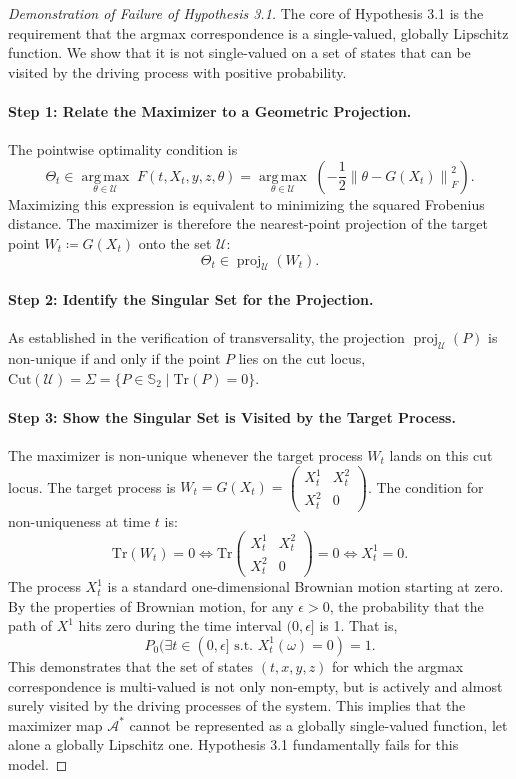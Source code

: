 \documentclass[12pt, letterpaper]{amsart}
\newcommand{\Thetacal}{\mathcal{A}}
\newcommand{\Ucal}{\mathcal{U}}
\newcommand{\norm}[1]{\left\lVert#1\right\rVert}
\newcommand{\Tr}{\mathrm{Tr}}
\DeclareMathOperator*{\argmax}{arg\,max}
\DeclareMathOperator*{\proj}{proj}
\theoremstyle{plain}
\theoremstyle{definition}
\theoremstyle{remark}
\numberwithin{equation}{section} %
\begin{document}
\begin{appendices}
\begin{proof}[Demonstration of Failure of Hypothesis 3.1]
The core of Hypothesis 3.1 is the requirement that the argmax correspondence is a single-valued, globally Lipschitz function. We show that it is not single-valued on a set of states that can be visited by the driving process with positive probability.

\paragraph{Step 1: Relate the Maximizer to a Geometric Projection.}
The pointwise optimality condition is
\[ \Theta_t \in \underset{\theta \in \Ucal}{\argmax} \; F(t,X_t,y,z,\theta) = \underset{\theta \in \Ucal}{\argmax} \; \left(-\frac{1}{2}\norm{\theta - G(X_t)}_F^2\right). \]
Maximizing this expression is equivalent to minimizing the squared Frobenius distance. The maximizer is therefore the nearest-point projection of the target point $W_t \coloneqq G(X_t)$ onto the set $\Ucal$:
\[ \Theta_t \in \proj_{\Ucal}(W_t). \]

\paragraph{Step 2: Identify the Singular Set for the Projection.}
As established in the verification of transversality, the projection $\proj_{\Ucal}(P)$ is non-unique if and only if the point $P$ lies on the cut locus, $\mathrm{Cut}(\Ucal) = \Sigma = \{ P \in \mathbb{S}_2 \mid \Tr(P) = 0 \}$.

\paragraph{Step 3: Show the Singular Set is Visited by the Target Process.}
The maximizer is non-unique whenever the target process $W_t$ lands on this cut locus. The target process is $W_t = G(X_t) = \begin{pmatrix} X_t^1 & X_t^2 \\ X_t^2 & 0 \end{pmatrix}$. The condition for non-uniqueness at time $t$ is:
\[ \Tr(W_t) = 0 \iff \Tr\begin{pmatrix} X_t^1 & X_t^2 \\ X_t^2 & 0 \end{pmatrix} = 0 \iff X_t^1 = 0. \]
The process $X_t^1$ is a standard one-dimensional Brownian motion starting at zero. By the properties of Brownian motion, for any $\epsilon > 0$, the probability that the path of $X^1$ hits zero during the time interval $(0, \epsilon]$ is 1. That is,
\[ P_0(\exists t \in (0, \epsilon] \text{ s.t. } X_t^1(\omega) = 0) = 1. \]
This demonstrates that the set of states $(t,x,y,z)$ for which the argmax correspondence is multi-valued is not only non-empty, but is actively and almost surely visited by the driving processes of the system. This implies that the maximizer map $\Thetacal^*$ cannot be represented as a globally single-valued function, let alone a globally Lipschitz one. Hypothesis 3.1 fundamentally fails for this model.
\end{proof}


\end{appendices}
\end{document}
